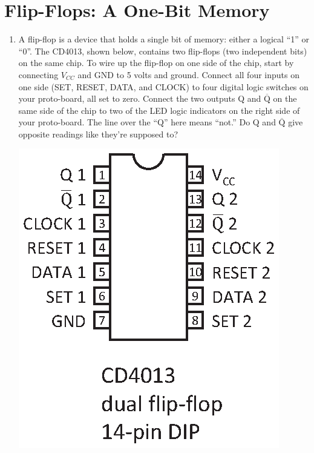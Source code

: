 \section{Flip-Flops: A One-Bit Memory}
\label{lab_flipflops}


\bigskip

\begin{enumerate}[wide]

\item A flip-flop is a device that holds a single bit of memory: either a logical ``1'' or ``0''.  The CD4013, shown below, contains two flip-flops (two independent bits) on the same chip.  To wire up the flip-flop on one side of the chip, start by connecting $V_{CC}$ and GND to 5 volts and ground.   Connect all four inputs on one side (SET, RESET, DATA, and CLOCK) to four digital logic switches on your proto-board, all set to zero. Connect the two outputs Q and $\mathrm{\overline{Q}}$ on the same side of the chip to two of the LED logic indicators on the right side of your proto-board.  The line over the ``Q'' here means ``not.''  Do Q and $\mathrm{\overline{Q}}$ give opposite readings like they're supposed to?
\begin{center}
\includegraphics[scale=0.8]{appendices/pinouts/cd4013.eps}
\end{center}  


\end{enumerate}
